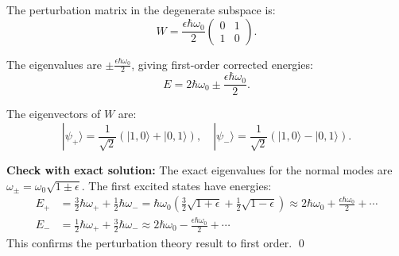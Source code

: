 \documentclass[12pt]{article}
\begin{document}
The perturbation matrix in the degenerate subspace is:
\[
W = \frac{\epsilon\hbar\omega_0}{2}\begin{pmatrix} 0 & 1 \\ 1 & 0 \end{pmatrix}.
\]

The eigenvalues are $\pm\frac{\epsilon\hbar\omega_0}{2}$, giving first-order corrected energies:
\[
\boxed{E = 2\hbar\omega_0 \pm \frac{\epsilon\hbar\omega_0}{2}}.
\]

The eigenvectors of $W$ are:
\[
|\psi_+\rangle = \frac{1}{\sqrt{2}}(|1,0\rangle + |0,1\rangle), \quad |\psi_-\rangle = \frac{1}{\sqrt{2}}(|1,0\rangle - |0,1\rangle).
\]

\textbf{Check with exact solution:} The exact eigenvalues for the normal modes are $\omega_\pm = \omega_0\sqrt{1\pm\epsilon}$. The first excited states have energies:
\begin{align*}
E_+ &= \frac{3}{2}\hbar\omega_+ + \frac{1}{2}\hbar\omega_- = \hbar\omega_0\left(\frac{3}{2}\sqrt{1+\epsilon} + \frac{1}{2}\sqrt{1-\epsilon}\right) \approx 2\hbar\omega_0 + \frac{\epsilon\hbar\omega_0}{2} + \cdots \\
E_- &= \frac{1}{2}\hbar\omega_+ + \frac{3}{2}\hbar\omega_- \approx 2\hbar\omega_0 - \frac{\epsilon\hbar\omega_0}{2} + \cdots
\end{align*}
This confirms the perturbation theory result to first order. \qed
\end{document}
